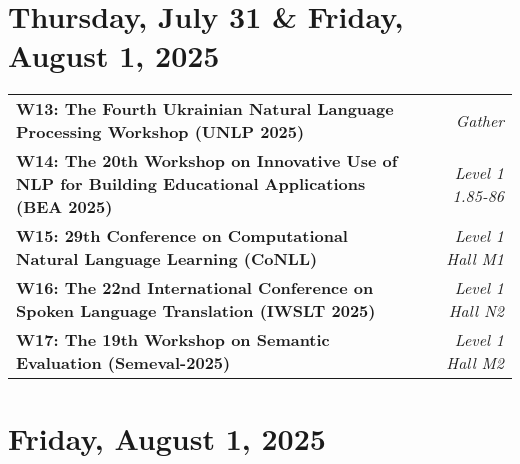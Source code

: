\clearpage

\section*{Thursday, July 31 & Friday, August 1, 2025}

\begin{tabularx}{\textwidth}{>{\raggedright}X r}

    \textbf{W13: The Fourth Ukrainian Natural Language Processing Workshop (UNLP 2025)} &
    \textit{Gather} \\

    \textbf{W14: The 20th Workshop on Innovative Use of NLP for Building Educational Applications (BEA 2025)} &
    \textit{Level 1 1.85-86} \\

    \textbf{W15: 29th Conference on Computational Natural Language Learning (CoNLL)} &
    \textit{Level 1 Hall M1} \\

    \textbf{W16: The 22nd International Conference on Spoken Language Translation (IWSLT 2025)} &
    \textit{Level 1 Hall N2} \\

    \textbf{W17: The 19th Workshop on Semantic Evaluation (Semeval-2025)} &
    \textit{Level 1 Hall M2} \\

\end{tabularx}


\section*{Friday, August 1, 2025}

